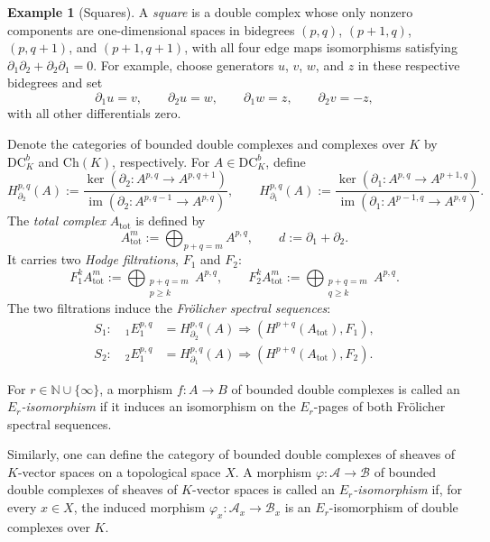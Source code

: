 \documentclass[11pt]{amsart}
\numberwithin{equation}{section}
\theoremstyle{plain}
\theoremstyle{definition}
\newtheorem{Ex}[thm]{Example}
\begin{document}
\begin{Ex}[Squares]\label{ex-square}\normalfont
A \emph{square} is a double complex whose only nonzero components are
one-dimensional spaces in bidegrees $(p,q)$, $(p+1,q)$, $(p,q+1)$, and
$(p+1,q+1)$, with all four edge maps isomorphisms satisfying
$\partial_1\partial_2+\partial_2\partial_1=0$.
For example, choose generators $u$, $v$, $w$, and $z$ in these respective
bidegrees and set
\[
\partial_1u=v,\qquad \partial_2u=w,\qquad
\partial_1w=z,\qquad \partial_2v=-z,
\]
with all other differentials zero.
\end{Ex}

Denote the categories of bounded double complexes and complexes over $K$ by
$\mathrm{DC}_K^b$ and $\mathrm{Ch}(K)$, respectively. 
For $A\in\mathrm{DC}_K^b$, define
\[
H_{\partial_2}^{p,q}(A):=
\frac{\ker(\partial_2:A^{p,q}\longrightarrow A^{p,q+1})}
{\operatorname{im}(\partial_2:A^{p,q-1}\longrightarrow A^{p,q})},
\qquad
H_{\partial_1}^{p,q}(A):=
\frac{\ker(\partial_1:A^{p,q}\longrightarrow A^{p+1,q})}
{\operatorname{im}(\partial_1:A^{p-1,q}\longrightarrow A^{p,q})}.
\]
The \emph{total complex} $A_{\mathrm{tot}}$ is defined by
\[
A_{\mathrm{tot}}^m:=\bigoplus_{p+q=m}A^{p,q},
\qquad d:=\partial_1+\partial_2.
\]
It carries two
\emph{Hodge filtrations}, $F_1^\cdot$ and $F_2^\cdot$:
\[
F_1^k A_{\mathrm{tot}}^m:= \bigoplus_{\substack{p+q=m \\ p \geq k}} A^{p,q}, \qquad
F_2^k A_{\mathrm{tot}}^m:= \bigoplus_{\substack{p+q=m \\ q \geq k}} A^{p,q}.
\]
The two filtrations induce the \emph{Fr\"olicher spectral sequences}:
\begin{align*}
S_1:\quad {}_1E_1^{p,q} &= H_{\partial_2}^{p,q}(A) \Longrightarrow (H^{p+q}(A_{\mathrm{tot}}), F_1), \\
S_2:\quad {}_2E_1^{p,q} &= H_{\partial_1}^{p,q}(A) \Longrightarrow (H^{p+q}(A_{\mathrm{tot}}), F_2).
\end{align*}

For $r\in\mathbb N\cup\{\infty\}$, a morphism
$f:A\longrightarrow B$ of bounded double complexes is called an
\emph{$E_r$-isomorphism} if it induces an isomorphism on the $E_r$-pages of both
Fr\"olicher spectral sequences.

Similarly, one can define the category of bounded double complexes of
sheaves of $K$-vector spaces on a topological space $X$.
A morphism $\varphi:\mathcal A\longrightarrow\mathcal B$ of bounded double
complexes of sheaves of $K$-vector spaces is called
an \emph{$E_r$-isomorphism} if, for every $x\in X$, the induced morphism
$\varphi_x:\mathcal A_x\longrightarrow\mathcal B_x$ is an $E_r$-isomorphism
of double complexes over $K$.
\end{document}
